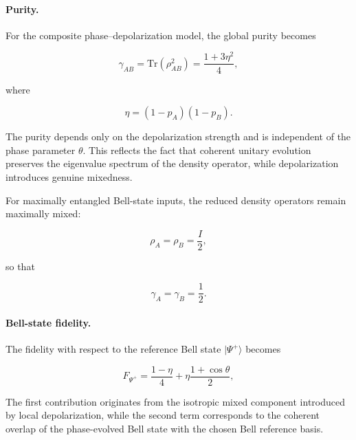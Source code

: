 \medskip

\paragraph{Purity.}

For the composite phase--depolarization model, the global purity becomes

\begin{equation}
\gamma_{AB}
=
\mathrm{Tr}
\left(
\rho_{AB}^{2}
\right)
=
\frac{1+3\eta^{2}}{4},
\label{eq:composite_channel_purity}
\end{equation}

where

\[
\eta=(1-p_A)(1-p_B).
\]

\medskip

The purity depends only on the depolarization strength and is independent of the phase parameter \( \theta \). This reflects the fact that coherent unitary evolution preserves the eigenvalue spectrum of the density operator, while depolarization introduces genuine mixedness.

\medskip

For maximally entangled Bell-state inputs, the reduced density operators remain maximally mixed:

\begin{equation}
\rho_A
=
\rho_B
=
\frac{I}{2},
\end{equation}

so that

\begin{equation}
\gamma_A
=
\gamma_B
=
\frac{1}{2}.
\end{equation}

\medskip

\paragraph{Bell-state fidelity.}

The fidelity with respect to the reference Bell state \( |\Psi^{+}\rangle \) becomes

\begin{equation}
F_{\Psi^{+}}
=
\frac{1-\eta}{4}
+
\eta
\frac{1+\cos\theta}{2},
\label{eq:composite_channel_fidelity}
\end{equation}

\medskip

The first contribution originates from the isotropic mixed component introduced by local depolarization, while the second term corresponds to the coherent overlap of the phase-evolved Bell state with the chosen Bell reference basis.

